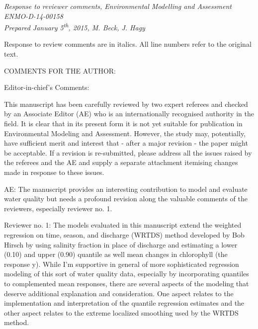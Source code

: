 \documentclass[letterpaper,12pt,oneside]{article}\usepackage[]{graphicx}\usepackage[]{color}
\begin{document}
\raggedbottom
\raggedright
{}
\setlength{\parindent}{0in}
\setlength{\parskip}{\baselineskip}

\textit{Response to reviewer comments, Environmental Modelling and Assessment ENMO-D-14-00158\\
Prepared January 5\textsuperscript{th}, 2015, M. Beck, J. Hagy}

Response to review comments are in italics.  All line numbers refer to the original text.

COMMENTS FOR THE AUTHOR:

Editor-in-chief's Comments:

This manuscript has been carefully reviewed by two expert referees and checked by an Associate Editor (AE) who is an internationally recognised authority in the field.  It is clear that in its present form it is not yet suitable for publication in Environmental Modeling and Assessment.  However, the study may, potentially, have sufficient merit and interest that - after a major revision - the paper might be acceptable. If a revision is re-submitted, please address all the issues raised by the referees and the AE and supply a separate attachment itemising changes made in response to these issues.



AE:
The manuscript provides an interesting contribution to model and evaluate water quality but needs a profound revision along the valuable comments of the reviewers, especially reviewer no. 1.


Reviewer no. 1: The models evaluated in this manuscript extend the weighted regression on time, season, and discharge (WRTDS) method developed by Bob Hirsch by using salinity fraction in place of discharge and estimating a lower (0.10) and upper (0.90) quantile as well mean changes in chlorophyll (the response y).  While I'm supportive in general of more sophisticated regression modeling of this sort of water quality data, especially by incorporating quantiles to complemented mean responses, there are several aspects of the modeling that deserve additional explanation and consideration.  One aspect relates to the implementation and interpretation of the quantile regression estimates and the other aspect relates to the extreme localized smoothing used by the WRTDS method.
\end{document}
